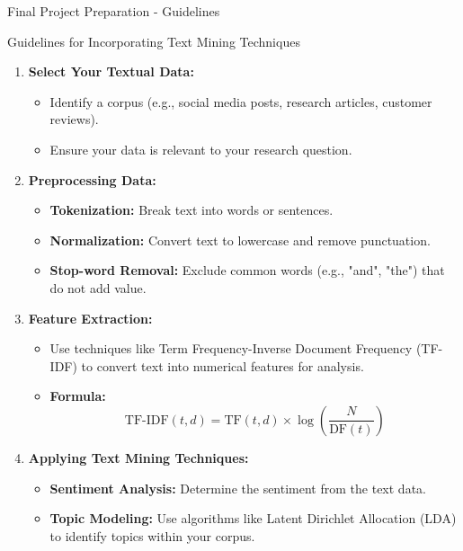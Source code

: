 \documentclass[aspectratio=169]{beamer}
\begin{document}
\begin{frame}[fragile]{Final Project Preparation - Guidelines}
    \begin{block}{Guidelines for Incorporating Text Mining Techniques}
        \begin{enumerate}
            \item \textbf{Select Your Textual Data:}
                \begin{itemize}
                    \item Identify a corpus (e.g., social media posts, research articles, customer reviews).
                    \item Ensure your data is relevant to your research question.
                \end{itemize}
            \item \textbf{Preprocessing Data:}
                \begin{itemize}
                    \item \textbf{Tokenization:} Break text into words or sentences.
                    \item \textbf{Normalization:} Convert text to lowercase and remove punctuation.
                    \item \textbf{Stop-word Removal:} Exclude common words (e.g., "and", "the") that do not add value.
                \end{itemize}
            \item \textbf{Feature Extraction:}
                \begin{itemize}
                    \item Use techniques like Term Frequency-Inverse Document Frequency (TF-IDF) to convert text into numerical features for analysis.
                    \item \textbf{Formula:}
                    \begin{equation}
                        \text{TF-IDF}(t, d) = \text{TF}(t, d) \times \log\left(\frac{N}{\text{DF}(t)}\right)
                    \end{equation}
                \end{itemize}
            \item \textbf{Applying Text Mining Techniques:}
                \begin{itemize}
                    \item \textbf{Sentiment Analysis:} Determine the sentiment from the text data.
                    \item \textbf{Topic Modeling:} Use algorithms like Latent Dirichlet Allocation (LDA) to identify topics within your corpus.
                \end{itemize}
        \end{enumerate}
    \end{block}
\end{frame}
\end{document}
